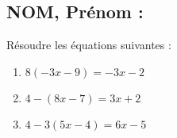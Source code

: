 \documentclass[a4paper,11pt,exos]{nsi} %
\begin{document}
\subsection*{NOM, Prénom : \dotfill} 


\maketitle




\begin{exercice}
Résoudre les équations suivantes :
\begin{multicols}{3}
	\begin{enumerate}
		\item $8(-3x-9)=-3x-2$
		\item $4-(8x-7)=3x+2$
		\item $4-3(5x-4)=6x-5$
	\end{enumerate}
\end{multicols}

\end{exercice}

\end{document}
